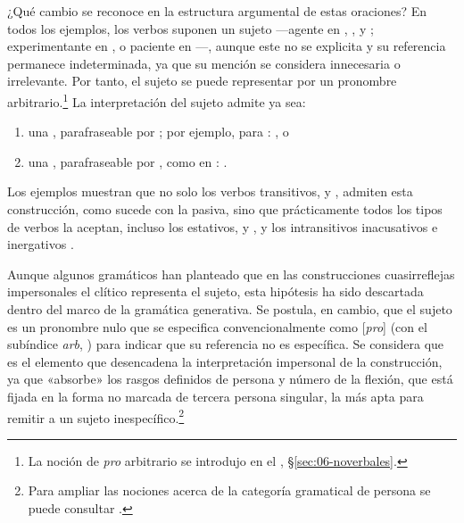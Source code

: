 ¿Qué cambio se reconoce en la estructura argumental de estas oraciones? En todos
los ejemplos, los verbos suponen un sujeto ---agente en ,
,  y ; experimentante
en , o paciente en ---, aunque este no se
explicita y su referencia permanece indeterminada, ya que su mención se
considera innecesaria o irrelevante. Por tanto, el sujeto se puede representar
por un pronombre arbitrario.\footnote{La noción de \textit{pro} arbitrario se
introdujo en el , §\ref{sec:06-noverbales}.} La interpretación del
sujeto admite ya sea:

\begin{enumerate}[label=\alph*)]
  \item una , parafraseable por ; por ejemplo, para : , o
  \item una , parafraseable por , como en : .
\end{enumerate}

Los ejemplos muestran que no solo los verbos transitivos,  y
, admiten esta construcción, como sucede con la pasiva, sino
que prácticamente todos los tipos de verbos la aceptan, incluso los estativos,
 y , y los intransitivos inacusativos
 e inergativos .

\begin{recuadro}
Aunque algunos gramáticos han planteado que en las construcciones cuasirreflejas
impersonales el clítico  representa el sujeto, esta hipótesis ha sido
descartada dentro del marco de la gramática generativa. Se postula, en cambio,
que el sujeto es un pronombre nulo que se especifica convencionalmente como
[\textit{pro}] (con el subíndice \textit{arb}, ) para
indicar que su referencia no es específica. Se considera que  es el
elemento que desencadena la interpretación impersonal de la construcción, ya que
«absorbe» los rasgos definidos de persona y número de la flexión, que está
fijada en la forma no marcada de tercera persona singular, la más apta para
remitir a un sujeto inespecífico.\footnote{Para ampliar las nociones acerca de
la categoría gramatical de persona se puede consultar
\textcite{cunarro2018}.}
\end{recuadro}

